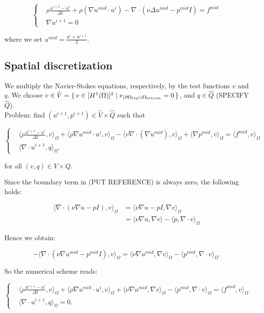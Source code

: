 \documentclass[11pt,a4paper,titlepage]{report}
\begin{document}
\[
\left\{  
\begin{aligned}
& \rho \frac{u^{i+1} - u^i}{\Delta t} + \rho (\nabla u^{mid} \cdot u^i) - \nabla \cdot (\nu \Delta u^{mid} - p^{mid}I) = f^{mid} \\
& \nabla u^{i+1} = 0
\end{aligned}
\right.
\]

where we set $u^{mid} = \frac{u^i + u^{i+1}}{2}$.

\subsection{Spatial discretization}
We multiply the Navier-Stokes equations, respectively, by the test functions $v$ and $q$. We choose $v \in \hat{V} = \set{v \in [H^1(\Omega)]^2 | v_|{_{\partial \Omega_{top} \cup \Omega_{bottom}}} = 0}$, and $q \in \hat{Q}$ (SPECIFY $\hat{Q}$). \\
Problem: find $(u^{i+1}, p^{i+1}) \in \hat{V} \times \hat{Q}$ such that 

\[
\left\{  
\begin{aligned}
& \langle \rho \frac{u^{i+1} - u^i}{\Delta t},v \rangle_\Omega
+ \langle \rho \nabla u^{mid} \cdot u^i  ,v \rangle_\Omega
- \langle v \nabla \cdot (\nabla u^{mid}) ,v \rangle_\Omega
+ \langle \nabla p^{mid} ,v \rangle_\Omega = \langle f^{mid} ,v \rangle_\Omega \\
& \langle \nabla \cdot u^{i+1},q \rangle_\Omega.
\end{aligned}
\right.
\]

for all $(v,q) \in V \times Q$.

Since the boundary term in (PUT REFERENCE) is always zero, the following holds:

\[
\begin{aligned}
\langle \nabla \cdot (\nu \nabla u - pI) ,v \rangle_\Omega & = \langle \nu \nabla u - pI ,\nabla v \rangle_\Omega \\
														& = \langle \nu \nabla u  ,\nabla v \rangle  - \langle p ,\nabla \cdot v \rangle_\Omega										
\end{aligned}
\]

Hence we obtain:

\[
- \langle \nabla \cdot (\nu \nabla u^{mid} - p^{mid}I) ,v \rangle_{\Omega} = \langle \nu \nabla u^{mid}, \nabla v \rangle_\Omega -  \langle p^{mid}, \nabla \cdot v \rangle_\Omega.
\]

So the numerical scheme reads:

\[
\left\{  
\begin{aligned}
& \langle \rho \frac{u^{i+1} - u^i}{\Delta t},v \rangle_\Omega
+ \langle \rho \nabla u^{mid} \cdot u^i  ,v \rangle_\Omega
+ \langle \nu \nabla u^{mid}, \nabla v \rangle_\Omega
- \langle p^{mid} , \nabla \cdot v \rangle_\Omega = \langle f^{mid} ,v \rangle_\Omega \\
& \langle \nabla \cdot u^{i+1},q \rangle_\Omega =  0.
\end{aligned}
\right.
\]
\end{document}
